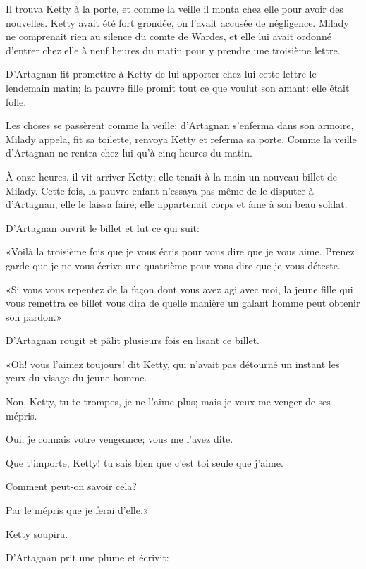 Il trouva Ketty à la porte, et comme la veille il monta chez elle pour avoir des nouvelles. Ketty avait été fort grondée, on l'avait accusée de négligence. Milady ne comprenait rien au silence du comte de Wardes, et elle lui avait ordonné d'entrer chez elle à neuf heures du matin pour y prendre une troisième lettre. 

D'Artagnan fit promettre à Ketty de lui apporter chez lui cette lettre le lendemain matin; la pauvre fille promit tout ce que voulut son amant: elle était folle. 

Les choses se passèrent comme la veille: d'Artagnan s'enferma dans son armoire, Milady appela, fit sa toilette, renvoya Ketty et referma sa porte. Comme la veille d'Artagnan ne rentra chez lui qu'à cinq heures du matin. 

À onze heures, il vit arriver Ketty; elle tenait à la main un nouveau billet de Milady. Cette fois, la pauvre enfant n'essaya pas même de le disputer à d'Artagnan; elle le laissa faire; elle appartenait corps et âme à son beau soldat. 

D'Artagnan ouvrit le billet et lut ce qui suit: 

«Voilà la troisième fois que je vous écris pour vous dire que je vous aime. Prenez garde que je ne vous écrive une quatrième pour vous dire que je vous déteste. 

«Si vous vous repentez de la façon dont vous avez agi avec moi, la jeune fille qui vous remettra ce billet vous dira de quelle manière un galant homme peut obtenir son pardon.» 

D'Artagnan rougit et pâlit plusieurs fois en lisant ce billet. 

«Oh! vous l'aimez toujours! dit Ketty, qui n'avait pas détourné un instant les yeux du visage du jeune homme. 

\speak  Non, Ketty, tu te trompes, je ne l'aime plus; mais je veux me venger de ses mépris. 

\speak  Oui, je connais votre vengeance; vous me l'avez dite. 

\speak  Que t'importe, Ketty! tu sais bien que c'est toi seule que j'aime. 

\speak  Comment peut-on savoir cela? 

\speak  Par le mépris que je ferai d'elle.» 

Ketty soupira. 

D'Artagnan prit une plume et écrivit: 

